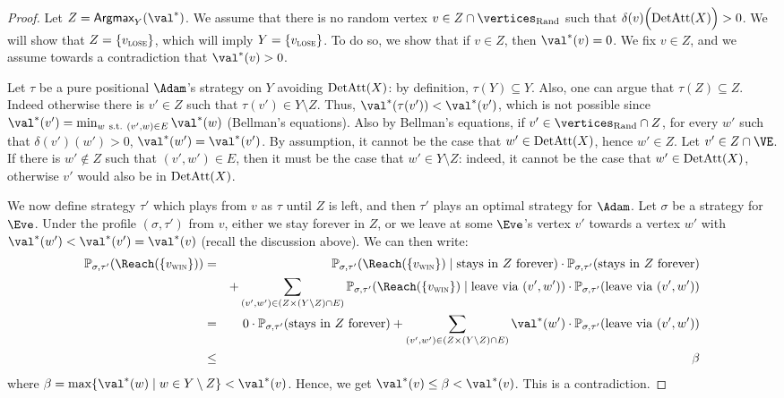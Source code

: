 \begin{proof}
Let $Z = \textsf{Argmax}_Y (\val^*)$. We assume that there is no
random vertex $v \in Z \cap \Randomvertices$ such that
$\delta(v)\Big(\textrm{DetAtt}(X)\Big)>0$. We will show that $Z =
\{v_{\textsc{lose}}\}$, which will imply $Y = \{v_{\textsc{lose}}\}$. To do so, we show
that if $v \in Z$, then $\val^*(v) = 0$.  We fix $v \in Z$, and we
assume towards a contradiction that $\val^*(v)>0$.

Let $\tau$ be a pure positional $\Adam$'s strategy on $Y$ avoiding
$\textrm{DetAtt}(X)$: by definition, $\tau(Y) \subseteq Y$. Also, one can
argue that $\tau(Z) \subseteq Z$. Indeed otherwise there is $v' \in
Z$ such that $\tau(v') \in Y \setminus Z$. Thus, $\val^*(\tau(v')) <
\val^*(v')$, which is not possible since $\val^*(v') = \min_{w\
\text{s.t.}\ (v',w) \in E} \val^*(w)$ (Bellman's equations). Also
by Bellman's equations, if $v' \in \Randomvertices \cap Z$, for
every $w'$ such that $\delta(v')(w')>0$, $\val^*(w') =
\val^*(v')$. By assumption, it cannot be the case that $w' \in
\textrm{DetAtt}(X)$, hence $w' \in Z$.  Let $v' \in Z \cap \Evevertices$. If
there is $w' \notin Z$ such that $(v',w') \in E$, then it must be
the case that $w' \in Y \setminus Z$: indeed, it cannot be the case
that $w' \in \textrm{DetAtt}(X)$, otherwise $v'$ would also be in
$\textrm{DetAtt}(X)$.

We now define strategy $\tau'$ which plays from $v$ as $\tau$ until
$Z$ is left, and then $\tau'$ plays an optimal strategy for $\Adam$.
Let $\sigma$ be a strategy for $\Eve$. Under the profile
$(\sigma,\tau')$ from $v$, either we stay forever in $Z$, or we
leave at some $\Eve$'s vertex $v'$ towards a vertex $w'$ with
$\val^*(w') < \val^*(v') = \val^*(v)$ (recall the discussion
above). We can then write:
\begin{eqnarray*}
\probm_{\sigma,\tau'}(\Reach(\{\vwin\})) &=&
\probm_{\sigma,\tau'}(\Reach(\{\vwin\}) \mid \text{stays in}\  Z\
\text{forever}) \cdot  \probm_{\sigma,\tau'}(\text{stays in}\  Z\
\text{forever}) \\ 
&& + \sum_{(v',w') \in (Z \times (Y \setminus Z) \cap E)} 
\probm_{\sigma,\tau'}(\Reach(\{\vwin\}) \mid
\text{leave via}\  (v',w')) \cdot
\probm_{\sigma,\tau'}(\text{leave via}\  (v',w')) \\
& = & 0 \cdot \probm_{\sigma,\tau'}(\text{stays in}\  Z\
\text{forever}) + \sum_{(v',w') \in (Z \times (Y \setminus Z) \cap
  E)}  \val^*(w') \cdot
\probm_{\sigma,\tau'}(\text{leave via}\  (v',w')) \\
& \le & \beta
\end{eqnarray*}
where $\beta = \max \{\val^*(w) \mid w \in Y \setminus Z\} <
\val^*(v)$.  Hence, we get $\val^*(v) \le \beta < \val^*(v)$. This
is a contradiction.
\end{proof}

